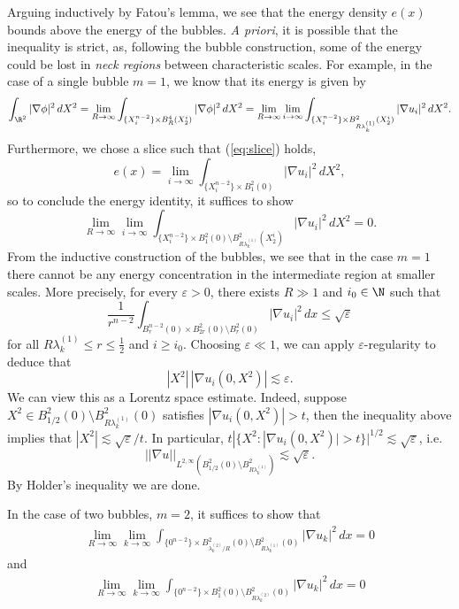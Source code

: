 \documentclass[reqno]{amsart}
\theoremstyle{definition}
\theoremstyle{remark}
\renewcommand{\epsilon}{\varepsilon}
\begin{document}
Arguing inductively by Fatou's lemma, we see that the energy density $e(x)$ bounds above the energy of the bubbles. \textit{A priori}, it is possible that the inequality is strict, as, following the bubble construction, some of the energy could be lost in \textit{neck regions} between characteristic scales. For example, in the case of a single bubble $m = 1$, we know that its energy is given by 
	\[ \int_{\R^2} |\nabla \phi|^2 \, dX^2 = \lim_{R \to \infty} \int_{\{X^{n - 2}_i \} \times B^4_R (X^i_2)} |\nabla \phi|^2 \, dX^2 = \lim_{R \to \infty} \lim_{i \to \infty} \int_{\{X^{n - 2}_i\} \times B^2_{R \lambda_k^{(1)}} (X^i_2)} |\nabla u_i|^2 \, dX^2. \]
Furthermore, we chose a slice such that (\ref{eq:slice}) holds, 
	\[ e(x) = \lim_{i \to \infty} \int_{\{X^{n - 2}_i\} \times B^2_{1} (0)} |\nabla u_i|^2 \, dX^2, \]
so to conclude the energy identity, it suffices to show
	\[  \lim_{R \to \infty} \lim_{i \to \infty} \int_{\{X^{n - 2}_i\} \times B^2_1 (0) \setminus B^2_{R \lambda_k^{(1)}} (X^i_2)} |\nabla u_i|^2 \, dX^2 = 0. \]		
From the inductive construction of the bubbles, we see that in the case $m = 1$ there cannot be any energy concentration in the intermediate region at smaller scales. More precisely, for every $\epsilon > 0$, there exists $R \gg 1$ and $i_0 \in \N$ such that
	\[  \frac{1}{r^{n - 2}} \int_{B_r^{n - 2} (0) \times B_{2r}^2 (0) \setminus B^2_r (0)} |\nabla u_i|^2 \, dx \leq \sqrt\epsilon \]
for all $R\lambda_k^{(1)} \leq r \leq \tfrac12$ and $i \geq i_0$. Choosing $\epsilon \ll 1$, we can apply $\epsilon$-regularity to deduce that
	\[ |X^2| \, |\nabla u_i (0, X^2)| \lesssim \epsilon. \]
We can view this as a Lorentz space estimate. Indeed, suppose  $X^2 \in B^2_{1/2} (0) \setminus B^2_{R \lambda_k^{(1)}} (0)$ satisfies $|\nabla u_i (0, X^2)| > t$, then the inequality above implies that $|X^2| \lesssim \sqrt\epsilon/t$. In particular, $t |\{ X^2 : |\nabla u_i (0, X^2)| > t\}|^{1/2} \lesssim \sqrt\epsilon$, i.e.
	\[ ||\nabla u||_{L^{2, \infty} ( B^2_{1/2} (0) \setminus B^2_{R \lambda_k^{(1)}})} \lesssim \sqrt\epsilon. \]
By Holder's inequality we are done. 

In the case of two bubbles, $m = 2$, it suffices to show that 
	\begin{align*}
		 \lim_{R \to \infty} \lim_{k \to \infty} \int_{\{0^{n - 2}\} \times B^2_{\lambda_k^{(2)}/R} (0) \setminus B^2_{R \lambda_k^{(1)}} (0)} |\nabla u_k|^2 \, dx =0 
	\end{align*}	 
and
	\begin{align*}
		 \lim_{R \to \infty} \lim_{k \to \infty} \int_{\{0^{n - 2}\} \times B^2_{1} (0) \setminus B^2_{R \lambda_k^{(2)}} (0)} |\nabla u_k|^2 \, dx = 0
	\end{align*}	
	
\end{document}
